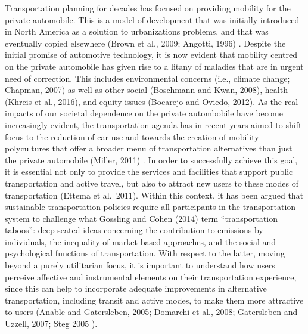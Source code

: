 \documentclass[]{elsarticle} %
\begin{document}
Transportation planning for decades has focused on providing mobility
for the private automobile. This is a model of development that was
initially introduced in North America as a solution to urbanizations
problems, and that was eventually copied elsewhere (Brown et al., 2009;
Angotti, 1996) . Despite the initial promise of automotive technology,
it is now evident that mobility centred on the private automobile has
given rise to a litany of maladies that are in urgent need of
correction. This includes environmental concerns (i.e., climate change;
Chapman, 2007) as well as other social (Boschmann and Kwan, 2008),
health (Khreis et al., 2016), and equity issues (Bocarejo and Oviedo,
2012). As the real impacts of our societal dependence on the private
autombobile have become increasingly evident, the transportation agenda
has in recent years aimed to shift focus to the reduction of car-use and
towards the creation of mobility polycultures that offer a broader menu
of transportation alternatives than just the private automobile (Miller,
2011) . In order to successfully achieve this goal, it is essential not
only to provide the services and facilities that support public
transportation and active travel, but also to attract new users to these
modes of transportation (Ettema et al.~2011). Within this context, it
has been argued that sustainable transportation policies require all
participants in the transportation system to challenge what Gossling and
Cohen (2014) term ``transportation taboos'': deep-seated ideas
concerning the contribution to emissions by individuals, the inequality
of market-based approaches, and the social and psychological functions
of transportation. With respect to the latter, moving beyond a purely
utilitarian focus, it is important to understand how users perceive
affective and instrumental elements on their transportation experience,
since this can help to incorporate adequate improvements in alternative
transportation, including transit and active modes, to make them more
attractive to users (Anable and Gatersleben, 2005; Domarchi et al.,
2008; Gatersleben and Uzzell, 2007; Steg 2005 ).
\end{document}
